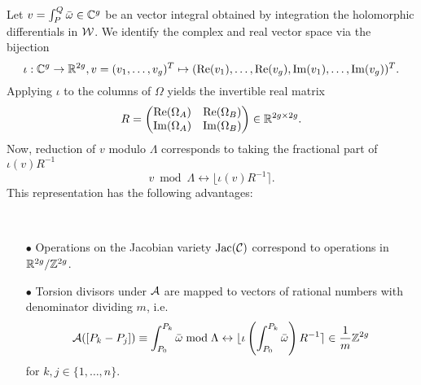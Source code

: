 \documentclass[main.tex]{subfiles}
\begin{document}
   Let $v = \int_P^Q \bar{\omega} \in \mathbb{C}^g$ be an vector integral obtained by integration the holomorphic differentials in
   $\mathcal{W}$.
   We identify the complex and real vector space via the bijection
   \begin{equation}
    \iota:\mathbb{C}^g \rightarrow \mathbb{R}^{2g},v = (v_1,\dots,v_g)^T \mapsto (\operatorname{Re}(v_1),\dots,\operatorname{Re}(v_g),\operatorname{Im}(v_1),\dots,\operatorname{Im}(v_g))^T.
   \end{equation}
    Applying $\iota$ to the columns of $\Omega$ yields the invertible real matrix
   \begin{equation}
    R = 
   \begin{pmatrix}
     \operatorname{Re}(\Omega_A) & \operatorname{Re}(\Omega_B) \\
     \operatorname{Im}(\Omega_A) & \operatorname{Im}(\Omega_B)
    \end{pmatrix} \in \mathbb{R}^{2g \times 2g}.
   \end{equation}
   Now, reduction of $v$ modulo $\Lambda$ corresponds to taking the fractional part of $\iota(v)R^{-1}$
   \begin{equation}
    v \bmod \Lambda \leftrightarrow \lfloor \iota(v)R^{-1} \rceil.
   \end{equation}
   This representation has the following advantages:
   \begin{rmk} \
    \begin{itemize}
     \item[$\bullet$] Operations on the Jacobian variety $\operatorname{Jac}(\mathcal{C})$ correspond to operations in $\mathbb{R}^{2g}/\mathbb{Z}^{2g}$.
     \item[$\bullet$] Torsion divisors under $\mathcal{A}$ are mapped to vectors of rational numbers with 
     denominator dividing $m$, i.e. 
     \begin{equation}
      \mathcal{A}([P_k - P_j]) \equiv \int_{P_0}^{P_k} \bar{\omega} \bmod \Lambda \leftrightarrow \lfloor \iota\left(\int_{P_0}^{P_k} \bar{\omega}\right)
      R^{-1} \rceil \in \frac{1}m\mathbb{Z}^{2g}
     \end{equation}
     for $k,j \in \{ 1,\dots,n \}$.
    \end{itemize}

    
   \end{rmk}

   
   
   
    

\biblio
\end{document}
